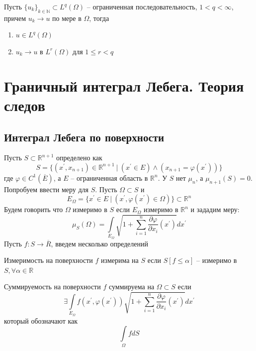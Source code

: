 \documentclass[12pt,a4paper]{article}
\newcommand{\intset}[1]{\int\limits_{#1}}
\newcommand{\Real}{\mathbb{R}}
\newcommand{\Natural}{\mathbb{N}}
\begin{document}
\begin{lemma}{}{}
	Пусть $\{u_k\}_{k\in\Natural} \subset L^q (\Omega)$ -- ограниченная последовательность, $1 < q < \infty$, причем $u_k \to u$ по мере в $\Omega$, тогда
	\begin{enumerate}
		\item $u \in L^q (\Omega)$
		\item $u_k \to u$ в $L^r (\Omega)$ для $1 \leq r < q$
	\end{enumerate}
\end{lemma}

\section{Граничный интеграл Лебега. Теория следов}

\subsection{Интеграл Лебега по поверхности}

Пусть $S \subset \Real^{n+1}$ определено как
\begin{equation*}
S = \{ (x^\prime, x_{n+1}) \in \Real^{n+1} \ | \ (x^\prime \in E) \wedge (x_{n+1} = \varphi(x^\prime))\}
\end{equation*}
где $\varphi \in C^1 (\overline{E})$, а $E$ -- ограниченная область в $\Real^n$. У $S$ нет $\mu_n$, а $\mu_{n+1} (S) = 0$. Попробуем ввести меру для $S$. Пусть $\Omega \subset S$ и 
\begin{equation*}
E_\Omega = \{ x^\prime \in E \ | \ (x^\prime, \varphi(x^\prime) \in \Omega)\} \subset \Real^n
\end{equation*}
Будем говорить что $\Omega$ измеримо в $S$ если $E_\Omega$ измеримо в $\Real^n$ и зададим меру:
\begin{equation*}
\mu_S (\Omega) = \intset{E_\Omega}{\sqrt{1 + \sum\limits_{i=1}^{n}{\frac{\partial \varphi}{\partial x_i} (x^\prime)}}dx^\prime}
\end{equation*}
Пусть $f : S \to \overline{R}$, введем несколько определений

\begin{definition}{Измеримость на поверхности}{}
	$f$ измерима на $S$ если $S[f \leq \alpha]$ -- измеримо в $S, \forall \alpha \in \Real$ 
\end{definition}

\begin{definition}{Суммируемость на поверхности}{}
	$f$ суммируема на $\Omega \subset S$ если
	\begin{equation*}
	\exists \intset{E_\Omega}{f(x^\prime, \varphi(x^\prime)) \sqrt{1 + \sum\limits_{i=1}^{n}{\frac{\partial \varphi}{\partial x_i} (x^\prime)}} dx^\prime}
	\end{equation*}
	который обозначают как 
	\begin{equation*}
	\intset{\Omega}{fdS}
	\end{equation*}
\end{definition}
\end{document}
